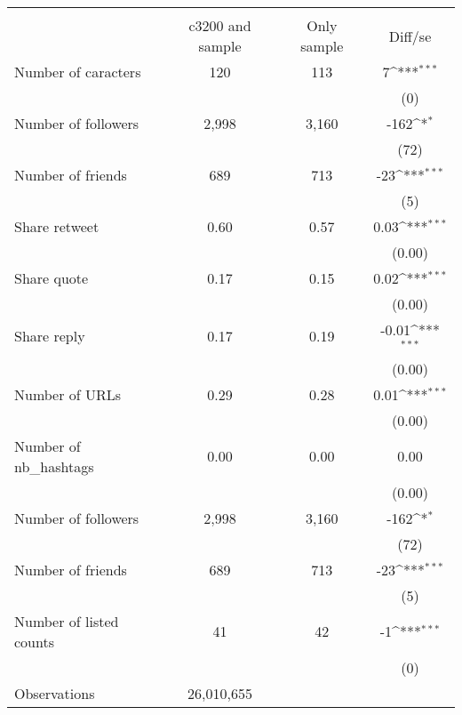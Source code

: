 {
\def\sym#1{\ifmmode^{#1}\else\(^{#1}\)\fi}
\begin{tabular}{l*{1}{ccc}}
\hline\hline
                    &\multicolumn{3}{c}{}                           \\
                    &c3200 and sample& Only sample&     Diff/se         \\
\hline
Number of caracters &         120&         113&           7\sym{***}\\
                    &            &            &         (0)         \\
Number of followers &       2,998&       3,160&        -162\sym{*}  \\
                    &            &            &        (72)         \\
Number of friends   &         689&         713&         -23\sym{***}\\
                    &            &            &         (5)         \\
Share retweet       &        0.60&        0.57&        0.03\sym{***}\\
                    &            &            &      (0.00)         \\
Share quote         &        0.17&        0.15&        0.02\sym{***}\\
                    &            &            &      (0.00)         \\
Share reply         &        0.17&        0.19&       -0.01\sym{***}\\
                    &            &            &      (0.00)         \\
Number of URLs      &        0.29&        0.28&        0.01\sym{***}\\
                    &            &            &      (0.00)         \\
Number of nb\_hashtags&        0.00&        0.00&        0.00         \\
                    &            &            &      (0.00)         \\
Number of followers &       2,998&       3,160&        -162\sym{*}  \\
                    &            &            &        (72)         \\
Number of friends   &         689&         713&         -23\sym{***}\\
                    &            &            &         (5)         \\
Number of listed counts&          41&          42&          -1\sym{***}\\
                    &            &            &         (0)         \\
\hline
Observations        &  26,010,655&            &                     \\
\hline\hline
\end{tabular}
}
